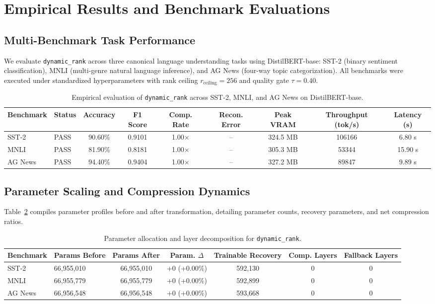\section{Empirical Results and Benchmark Evaluations}
\label{sec:results}

\subsection{Multi-Benchmark Task Performance}
We evaluate \texttt{dynamic\_rank} across three canonical language understanding tasks using DistilBERT-base: SST-2 (binary sentiment classification), MNLI (multi-genre natural language inference), and AG News (four-way topic categorization). All benchmarks were executed under standardized hyperparameters with rank ceiling $r_{\mathrm{ceiling}} = 256$ and quality gate $\tau = 0.40$.

\begin{table}[t]
\centering
\small
\begin{tabular}{llccccccc}
\toprule
\textbf{Benchmark} & \textbf{Status} & \textbf{Accuracy} & \textbf{F1 Score} & \textbf{Comp. Rate} & \textbf{Recon. Error} & \textbf{Peak VRAM} & \textbf{Throughput (tok/s)} & \textbf{Latency (s)} \\
\midrule
SST-2 & PASS & 90.60\% & 0.9101 & 1.00$\times$ & -- & 324.5 MB & 106166 & 6.80 s \\
MNLI & PASS & 81.90\% & 0.8181 & 1.00$\times$ & -- & 305.3 MB & 53344 & 15.90 s \\
AG News & PASS & 94.40\% & 0.9404 & 1.00$\times$ & -- & 327.2 MB & 89847 & 9.89 s \\
\bottomrule
\end{tabular}
\caption{Empirical evaluation of \texttt{dynamic\_rank} across SST-2, MNLI, and AG News on DistilBERT-base.}
\label{tab:results_dynamic_rank}
\end{table}

\subsection{Parameter Scaling and Compression Dynamics}
Table~\ref{tab:params_dynamic_rank} compiles parameter profiles before and after transformation, detailing parameter counts, recovery parameters, and net compression ratios.

\begin{table}[t]
\centering
\small
\begin{tabular}{llccccc}
\toprule
\textbf{Benchmark} & \textbf{Params Before} & \textbf{Params After} & \textbf{Param. $\Delta$} & \textbf{Trainable Recovery} & \textbf{Comp. Layers} & \textbf{Fallback Layers} \\
\midrule
SST-2 & 66,955,010 & 66,955,010 & +0 (+0.00\%) & 592,130 & 0 & 0 \\
MNLI & 66,955,779 & 66,955,779 & +0 (+0.00\%) & 592,899 & 0 & 0 \\
AG News & 66,956,548 & 66,956,548 & +0 (+0.00\%) & 593,668 & 0 & 0 \\
\bottomrule
\end{tabular}
\caption{Parameter allocation and layer decomposition for \texttt{dynamic\_rank}.}
\label{tab:params_dynamic_rank}
\end{table}

